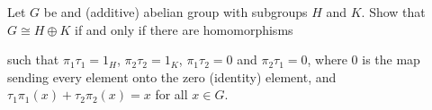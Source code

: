 \begin{ex}
    Let $G$ be and (additive) abelian group with subgroups $H$ and $K$. Show that $G\cong H\oplus K$ if and only if there are homomorphisms 
    
    \begin{figure}[H]\centering
    \end{figure}
    such that $\pi_{1}\tau_{1}=1_{H}$, $\pi_{2}\tau_{2}=1_{K}$, $\pi_{1}\tau_{2}=0$ and $\pi_{2}\tau_{1}=0$, where 0 is the map sending every element onto the zero (identity) element, and $\tau_{1}\pi_{1}(x)+\tau_{2}\pi_{2}(x)=x$ for all $x\in G$.
\end{ex}

